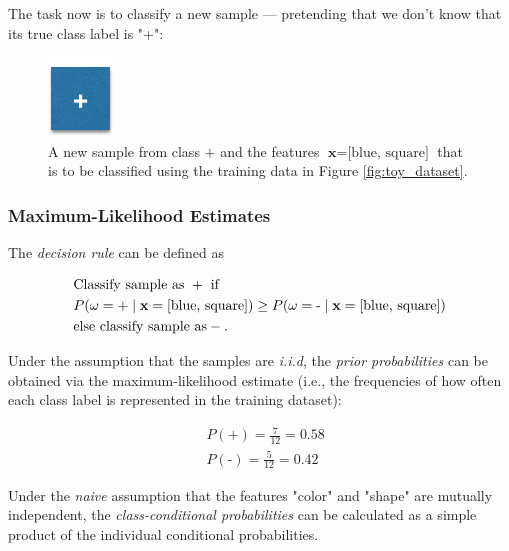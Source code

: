 \documentclass{article}
\begin{document}
 The task now is to classify a new sample --- pretending that we don't know that its true class label is "+":
 
 
 \begin{figure}[h!]
\includegraphics[scale=0.5]{../images/toy_dataset_2.png}
\caption{A new sample from class $+$ and the features $\textbf{x} = \text{[blue, square]}$ that is to be classified using the training data in Figure \ref{fig:toy_dataset}.}
\label{fig:new_sample1}
\end{figure}
 
\subsubsection{Maximum-Likelihood Estimates}
 

The \emph{decision rule} can be defined as

\begin{equation} 
\begin{split}
& \text{Classify sample as } +  \text{ if}   \\
& P(\omega=\text{+} \mid \textbf x = \text{[blue, square]}) \geq P(\omega=\text{-} \mid \textbf x = \text{[blue, square]})\\
& \text{else classify sample as} -. 
\end{split}
\end{equation} 



Under the assumption that the samples are \emph{i.i.d}, the  \emph{prior probabilities} can be obtained via the maximum-likelihood estimate (i.e., the frequencies of how often each class label is represented in the training dataset):

\begin{equation} 
\begin{split}
& P(\text{+}) = \frac{7}{12} = 0.58 \\
& P(\text{-}) = \frac{5}{12} = 0.42
\end{split}
\end{equation} 


Under the \emph{naive} assumption that the features "color" and "shape" are mutually independent, the \emph{class-conditional probabilities} can be calculated as a simple product of the individual conditional probabilities.
\end{document}
